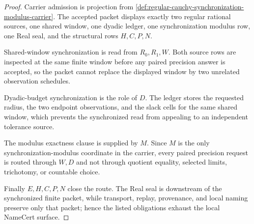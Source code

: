 \begin{proof}
Carrier admission is projection from \autoref{def:regular-cauchy-synchronization-modulus-carrier}. The accepted packet displays exactly two regular rational sources, one shared window, one dyadic ledger, one synchronization modulus row, one Real seal, and the structural rows $H,C,P,N$.

Shared-window synchronization is read from $R_0,R_1,W$. Both source rows are inspected at the same finite window before any paired precision answer is accepted, so the packet cannot replace the displayed window by two unrelated observation schedules.

Dyadic-budget synchronization is the role of $D$. The ledger stores the requested radius, the two endpoint observations, and the slack cells for the same shared window, which prevents the synchronized read from appealing to an independent tolerance source.

The modulus exactness clause is supplied by $M$. Since $M$ is the only synchronization-modulus coordinate in the carrier, every paired precision request is routed through $W,D$ and not through quotient equality, selected limits, trichotomy, or countable choice.

Finally $E,H,C,P,N$ close the route. The Real seal is downstream of the synchronized finite packet, while transport, replay, provenance, and local naming preserve only that packet; hence the listed obligations exhaust the local NameCert surface.
\end{proof}

